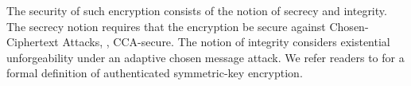 The security of such encryption consists of the notion of secrecy and integrity. The secrecy notion requires that the encryption be secure against Chosen-Ciphertext Attacks, \ie, CCA-secure. The notion of integrity considers existential unforgeability under an adaptive chosen message attack. We refer readers to \cite{KatzLindell2014} for a formal definition of authenticated symmetric-key encryption. 




